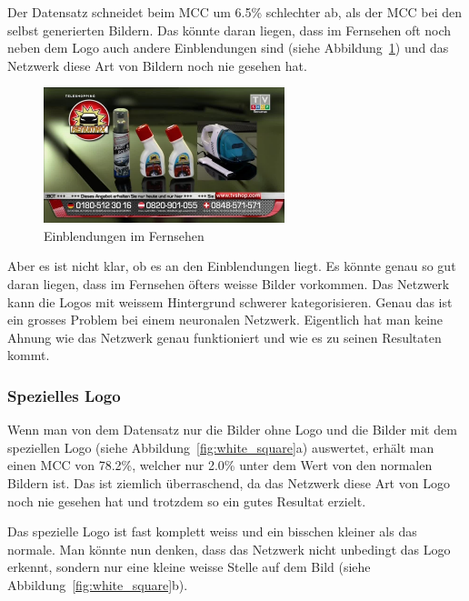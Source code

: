 \documentclass[12pt,a4paper]{report}
\begin{document}
Der Datensatz schneidet beim MCC um 6.5\% schlechter ab, als der MCC bei den selbst generierten Bildern.
Das könnte daran liegen, dass im Fernsehen oft noch neben dem Logo auch andere Einblendungen sind (siehe Abbildung~\ref{fig:einblenden})
und das Netzwerk diese Art von Bildern noch nie gesehen hat.
\begin{figure}[h]%
    \centering
    \includegraphics[width=7cm]{assets/images/tv_einblenden.jpg}%
    \caption{Einblendungen im Fernsehen}%
    \label{fig:einblenden}%
\end{figure}
Aber es ist nicht klar, ob es an den Einblendungen liegt.
Es könnte genau so gut daran liegen,
dass im Fernsehen öfters weisse Bilder vorkommen.
Das Netzwerk kann die Logos mit weissem Hintergrund schwerer kategorisieren.
Genau das ist ein grosses Problem bei einem neuronalen Netzwerk.
Eigentlich hat man keine Ahnung wie das Netzwerk genau funktioniert und wie es zu seinen Resultaten kommt.
\subsubsection{Spezielles Logo}
Wenn man von dem Datensatz nur die Bilder ohne Logo und die Bilder mit dem speziellen Logo (siehe Abbildung~\ref{fig:white_square}a) auswertet,
erhält man einen MCC von 78.2\%, welcher nur 2.0\% unter dem Wert von den normalen Bildern ist.
Das ist ziemlich überraschend, da das Netzwerk diese Art von Logo noch nie gesehen hat und trotzdem so ein gutes Resultat erzielt.

Das spezielle Logo ist fast komplett weiss und ein bisschen kleiner als das normale.
Man könnte nun denken, dass das Netzwerk nicht unbedingt das Logo erkennt,
sondern nur eine kleine weisse Stelle auf dem Bild (siehe Abbildung~\ref{fig:white_square}b).
\end{document}
